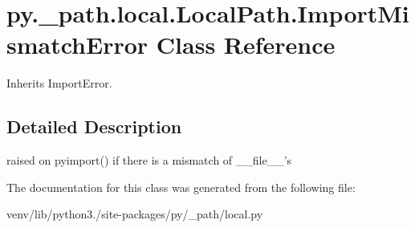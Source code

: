 \hypertarget{classpy_1_1__path_1_1local_1_1_local_path_1_1_import_mismatch_error}{}\section{py.\+\_\+path.\+local.\+Local\+Path.\+Import\+Mismatch\+Error Class Reference}
\label{classpy_1_1__path_1_1local_1_1_local_path_1_1_import_mismatch_error}


Inherits Import\+Error.



\subsection{Detailed Description}
\begin{DoxyVerb}raised on pyimport() if there is a mismatch of __file__'s\end{DoxyVerb}
 

The documentation for this class was generated from the following file\+:\begin{DoxyCompactItemize}
\item 
venv/lib/python3./site-\/packages/py/\+\_\+path/local.\+py\end{DoxyCompactItemize}
